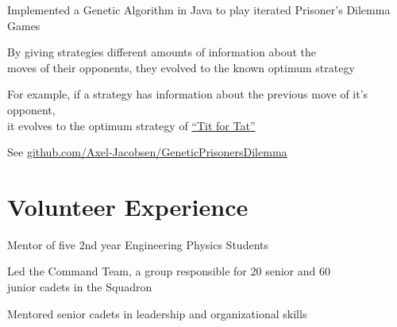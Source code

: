\documentclass[]{deedy-resume-openfont}
\begin{document}
\begin{tightemize}
	\item Implemented a Genetic Algorithm in Java to play iterated Prisoner's Dilemma Games
	\item By giving strategies different amounts of information about the \\ moves of their opponents, they evolved to the known optimum strategy
	\item For example, if a strategy has information about the previous move of it's opponent,\\ it evolves to the optimum strategy of \href{https://en.wikipedia.org/wiki/Tit_for_tat}{``Tit for Tat''}
    \item See \href{https://github.com/Axel-Jacobsen/GeneticPrisonersDilemma}{github.com/Axel-Jacobsen/GeneticPrisonersDilemma}
    \vspace{15pt}
\end{tightemize}
\sectionsep

\section{Volunteer Experience}
\begin{tightemize}
	\item Mentor of five 2nd year Engineering Physics Students
\end{tightemize}
\sectionsep

\begin{tightemize}
	\item Led the Command Team, a group responsible for 20 senior and 60 \\  junior cadets in the Squadron
    \item Mentored senior cadets in leadership and organizational skills
    \vspace{15pt}
\end{tightemize}
\sectionsep
\end{document}
